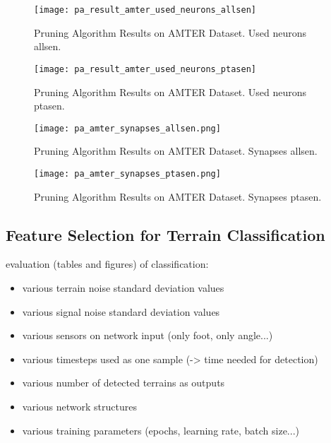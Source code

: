 \begin{figure}[H]
  \centering
  \texttt{[image: pa\_result\_amter\_used\_neurons\_allsen]}
  \caption{Pruning Algorithm Results on AMTER Dataset. Used neurons allsen.}
  \label{fig:pa_amter_used_neurons_allsen}
\end{figure}

\begin{figure}[H]
  \centering
  \texttt{[image: pa\_result\_amter\_used\_neurons\_ptasen]}
  \caption{Pruning Algorithm Results on AMTER Dataset. Used neurons ptasen.}
  \label{fig:pa_amter_used_neurons_ptasen}
\end{figure}

\begin{figure}[H]
  \centering
  \texttt{[image: pa\_amter\_synapses\_allsen.png]}
  \caption{Pruning Algorithm Results on AMTER Dataset. Synapses allsen.}
  \label{fig:pa_amter_synapses_allsen}
\end{figure}

\begin{figure}[H]
  \centering
  \texttt{[image: pa\_amter\_synapses\_ptasen.png]}
  \caption{Pruning Algorithm Results on AMTER Dataset. Synapses ptasen.}
  \label{fig:pa_amter_synapses_ptasen}
\end{figure}

\subsection{Feature Selection for Terrain Classification} \label{ssec:pa_amter_feature_selection}

evaluation (tables and figures) of classification:
\begin{itemize}
\item various terrain noise standard deviation values
\item various signal noise standard deviation values
\item various sensors on network input (only foot, only angle...)
\item various timesteps used as one sample (-> time needed for detection)
\item various number of detected terrains as outputs
\item various network structures
\item various training parameters (epochs, learning rate, batch size...)
\end{itemize}


